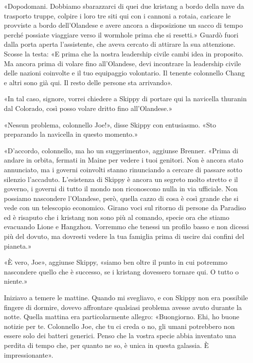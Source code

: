 «Dopodomani. Dobbiamo sbarazzarci di quei due kristang a bordo della
nave da trasporto truppe, colpire i loro tre siti qui con i cannoni a
rotaia, caricare le provviste a bordo dell'Olandese e avere ancora a
disposizione un sacco di tempo perché possiate viaggiare verso il
wormhole prima che si resetti.» Guardò fuori dalla porta aperta
l'assistente, che aveva cercato di attirare la sua attenzione. Scosse la
testa: «E prima che la nostra leadership civile cambi idea in proposito.
Ma ancora prima di volare fino all'Olandese, devi incontrare la
leadership civile delle nazioni coinvolte e il tuo equipaggio
volontario. Il tenente colonnello Chang e altri sono già qui. Il resto
delle persone sta arrivando».

«In tal caso, signore, vorrei chiedere a Skippy di portare qui la
navicella thuranin dal Colorado, così posso volare dritto fino
all'Olandese.»

«Nessun problema, colonnello Joe!», disse Skippy con entusiasmo. «Sto
preparando la navicella in questo momento.»

«D'accordo, colonnello, ma ho un suggerimento», aggiunse Brenner. «Prima
di andare in orbita, fermati in Maine per vedere i tuoi genitori. Non è
ancora stato annunciato, ma i governi coinvolti stanno rinunciando a
cercare di passare sotto silenzio l'accaduto. L'esistenza di Skippy è
ancora un segreto molto stretto e il governo, i governi di tutto il
mondo non riconoscono nulla in via ufficiale. Non possiamo nascondere
l'Olandese, però, quella cazzo di cosa è così grande che si vede con un
telescopio economico. Girano voci sul ritorno di persone da Paradiso ed
è risaputo che i kristang non sono più al comando, specie ora che stiamo
evacuando Lione e Hangzhou. Vorremmo che tenessi un profilo basso e non
dicessi più del dovuto, ma dovresti vedere la tua famiglia prima di
uscire dai confini del pianeta.»

«È vero, Joe», aggiunse Skippy, «siamo ben oltre il punto in cui
potremmo nascondere quello che è successo, se i kristang dovessero
tornare qui. O tutto o niente.»

\hfill\break

Iniziavo a temere le mattine. Quando mi svegliavo, e con Skippy non era
possibile fingere di dormire, dovevo affrontare qualsiasi problema
avesse avuto durante la notte. Quella mattina era particolarmente
allegro: «Buongiorno. Ehi, ho buone notizie per te. Colonnello Joe, che
tu ci creda o no, gli umani potrebbero non essere solo dei batteri
generici. Penso che la vostra specie abbia inventato una perdita di
tempo che, per quanto ne so, è unica in questa galassia. È
impressionante».

